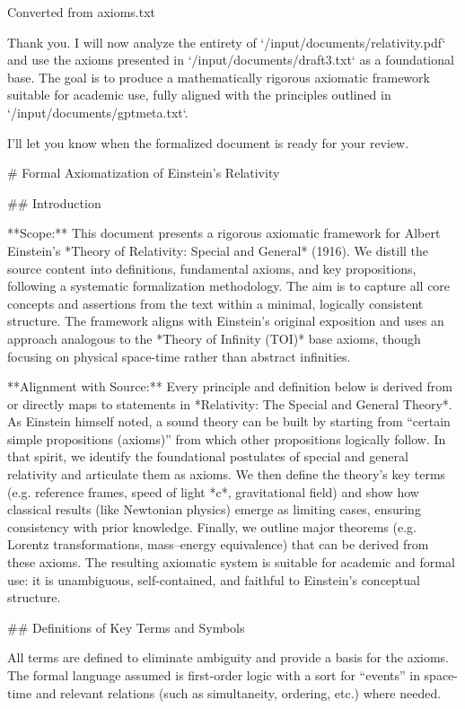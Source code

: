 \documentclass{article}
\begin{document}
Converted from axioms.txt

Thank you. I will now analyze the entirety of `/input/documents/relativity.pdf` and use the axioms presented in `/input/documents/draft3.txt` as a foundational base. The goal is to produce a mathematically rigorous axiomatic framework suitable for academic use, fully aligned with the principles outlined in `/input/documents/gptmeta.txt`.

I’ll let you know when the formalized document is ready for your review.


# Formal Axiomatization of Einstein’s Relativity

## Introduction

**Scope:** This document presents a rigorous axiomatic framework for Albert Einstein’s *Theory of Relativity: Special and General* (1916). We distill the source content into definitions, fundamental axioms, and key propositions, following a systematic formalization methodology. The aim is to capture all core concepts and assertions from the text within a minimal, logically consistent structure. The framework aligns with Einstein’s original exposition and uses an approach analogous to the *Theory of Infinity (TOI)* base axioms, though focusing on physical space-time rather than abstract infinities.

**Alignment with Source:** Every principle and definition below is derived from or directly maps to statements in *Relativity: The Special and General Theory*. As Einstein himself noted, a sound theory can be built by starting from “certain simple propositions (axioms)” from which other propositions logically follow. In that spirit, we identify the foundational postulates of special and general relativity and articulate them as axioms. We then define the theory’s key terms (e.g. reference frames, speed of light *c*, gravitational field) and show how classical results (like Newtonian physics) emerge as limiting cases, ensuring consistency with prior knowledge. Finally, we outline major theorems (e.g. Lorentz transformations, mass–energy equivalence) that can be derived from these axioms. The resulting axiomatic system is suitable for academic and formal use: it is unambiguous, self-contained, and faithful to Einstein’s conceptual structure.

## Definitions of Key Terms and Symbols

All terms are defined to eliminate ambiguity and provide a basis for the axioms. The formal language assumed is first-order logic with a sort for “events” in space-time and relevant relations (such as simultaneity, ordering, etc.) where needed.
\end{document}
